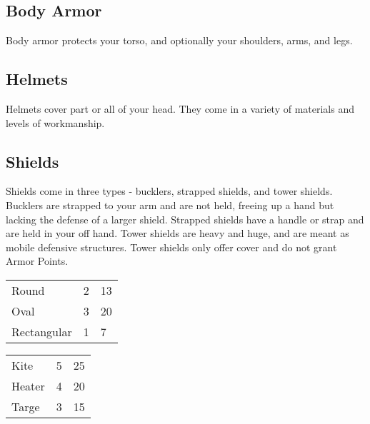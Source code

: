 \begin{multicols}{2}
\subsection{Body Armor}

Body armor protects your torso, and optionally your shoulders,
arms, and legs.

\subsection{Helmets}

Helmets cover part or all of your head. They come in a variety
of materials and levels of workmanship.

\subsection{Shields}

Shields come in three types - bucklers, strapped shields, and
tower shields. Bucklers are strapped to your arm and are not
held, freeing up a hand but lacking the defense of a larger
shield. Strapped shields have a handle or strap and are held
in your off hand. Tower shields are heavy and huge, and are
meant as mobile defensive structures. Tower shields only offer
cover and do not grant Armor Points.

\begin{center}
\begin{xtabular}{|l|l|l|}
Round & 2 & 13 \\
Oval & 3 & 20 \\
Rectangular & 1 & 7 \\
\hline
\end{xtabular}
\end{center}

\begin{center}
\begin{xtabular}{|l|l|l|}
Kite & 5 & 25 \\
Heater & 4 & 20 \\
Targe & 3 & 15 \\
\hline
\end{xtabular}
\end{center}


\end{multicols}
